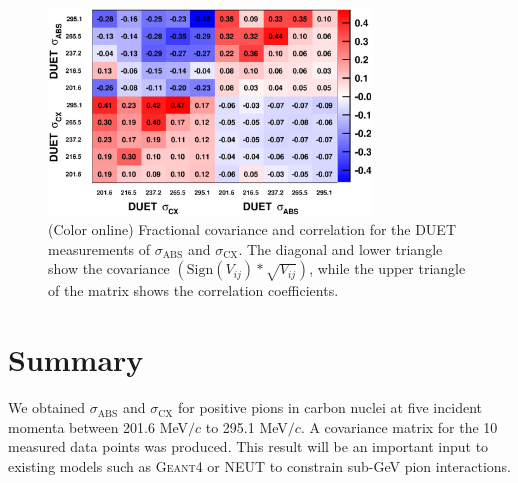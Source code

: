\begin{figure}[h]
\begin{center}
\includegraphics[width=86mm]{figures/duet_fractional_covariance_forpaper_v4.eps}
\caption{(Color online) Fractional covariance and correlation for the DUET measurements of $\sigma_{\mathrm{ABS}}$ and $\sigma_{\mathrm{CX}}$. The  diagonal and lower triangle show the covariance $(\mathrm{Sign}(V_{ij})*\sqrt{V_{ij}})$, while the upper triangle of the matrix shows the correlation coefficients.}
\label{fig:covariance}
\end{center} 
\end{figure}

\section{Summary}
We obtained $\sigma_{\mathrm{ABS}}$ and $\sigma_{\mathrm{CX}}$ for positive pions in carbon nuclei at five incident momenta between 201.6 MeV$/c$ to 295.1 MeV$/c$. A covariance matrix for the 10 measured data points was produced. This result will be an important input to existing models such as \textsc{Geant4} or \textsc{NEUT} to constrain sub-GeV pion interactions.
